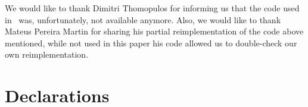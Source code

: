 \documentclass[smallextended]{svjour3}       %
\begin{document}
\begin{comment}
\begin{align}
\mbox{max.} & \sum_{j \in \bar{J}} p_j y_j \label{eq:objfun}\\
\mbox{s.t.} & \specialcell{\sum_{o \in O}\sum_{q \in Q_{jo}} x^o_{qj} + y_j \leq \sum_{k \in J}\sum_{o \in O}\sum_{q \in Q_{ko}} a^o_{qkj} x^o_{qk} \hspace*{0.15\textwidth} \forall j \in \bar{J}, j \neq 0,}\label{eq:}\\
            & \specialcell{\sum_{o \in O}\sum_{q \in Q_{jo}} x^o_{qj} \leq \sum_{k \in J}\sum_{o \in O}\sum_{q \in Q_{ko}} a^o_{qkj} x^o_{qk} \hspace*{\fill} \forall j \in J\setminus\bar{J},}\label{eq:}\\
	    & \specialcell{\sum_{o \in O}\sum_{q \in Q_{0o}} x^o_{q0} + y_0 \leq 1 \hspace*{\fill} ,}\label{eq:}\\
            & \specialcell{y_j \leq u_j \hspace*{\fill} \forall j \in \bar{J},}\label{eq:}\\
	    & \specialcell{x^o_{qj} \in \mathbb{N}^0 \hspace*{\fill} \forall j \in J, o \in O, q \in Q_{jo},}\label{eq:}\\
            & \specialcell{y_j \in \mathbb{N}^0 \hspace*{\fill} \forall j \in \bar{J}.}\label{eq:}
\end{align}
\end{comment}

\begin{acknowledgements}
We would like to thank Dimitri Thomopulos for informing us that the code used in~\cite{furini:2016,dimitri_thesis} was, unfortunately, not available anymore.
Also, we would like to thank Mateus Pereira Martin for sharing his partial reimplementation of the code above mentioned, while not used in this paper his code allowed us to double-check our own reimplementation.
\end{acknowledgements}

%
\section*{Declarations}
\end{document}
